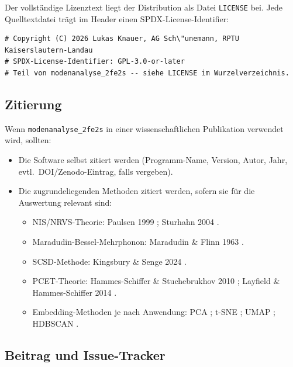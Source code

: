 \documentclass[11pt,a4paper,twoside]{article}
\theoremstyle{remark}
\begin{document}
Der vollst\"andige Lizenztext liegt der Distribution als Datei
\texttt{LICENSE} bei. Jede Quelltextdatei tr\"agt im Header einen
SPDX-License-Identifier:

\begin{lstlisting}[style=python]
# Copyright (C) 2026 Lukas Knauer, AG Sch\"unemann, RPTU Kaiserslautern-Landau
# SPDX-License-Identifier: GPL-3.0-or-later
# Teil von modenanalyse_2fe2s -- siehe LICENSE im Wurzelverzeichnis.
\end{lstlisting}

\subsection{Zitierung}

Wenn \texttt{modenanalyse\_2fe2s} in einer wissenschaftlichen
Publikation verwendet wird, sollten:

\begin{itemize}
  \item Die Software selbst zitiert werden (Programm-Name, Version,
        Autor, Jahr, evtl.\ DOI/Zenodo-Eintrag, falls vergeben).
  \item Die zugrundeliegenden Methoden zitiert werden, sofern sie f\"ur
        die Auswertung relevant sind:
        \begin{itemize}
          \item NIS/NRVS-Theorie: Paulsen 1999 \cite{Paulsen1999};
                Sturhahn 2004 \cite{Sturhahn2004}.
          \item Maradudin-Bessel-Mehrphonon: Maradudin \& Flinn 1963
                \cite{MaradudinFlinn1963}.
          \item SCSD-Methode: Kingsbury \& Senge 2024
                \cite{Kingsbury2024}.
          \item PCET-Theorie: Hammes-Schiffer \& Stuchebrukhov 2010
                \cite{HammesSchiffer2010};
                Layfield \& Hammes-Schiffer 2014
                \cite{LayfieldHammesSchiffer2014}.
          \item Embedding-Methoden je nach Anwendung: PCA
                \cite{Pearson1901}; t-SNE \cite{vanDerMaaten2008};
                UMAP \cite{McInnes2018}; HDBSCAN \cite{Campello2013}.
        \end{itemize}
\end{itemize}

\subsection{Beitrag und Issue-Tracker}
\end{document}
